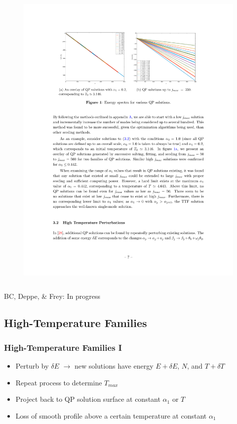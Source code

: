 \documentclass[mathserif,10pt]{beamer}
\newcommand{\bi}{\begin{itemize}}
\newcommand{\ei}{\end{itemize}}
\newcommand{\its}{\item}
\newcommand{\scr}{\scriptsize}
\begin{document}
{{\begin{columns}
\begin{figure}
  \includegraphics[scale=0.75]{families}
  \end{figure}
  \end{columns}
  \begin{center}
  {\scr BC, Deppe, \& Frey: In progress}
  \end{center}
  
  \vfill
}


\subsection{High-Temperature Families}
\frame
{
  \frametitle{High-Temperature Families I}
  \bi
  \its Perturb by $\delta E$ $\to$ new solutions have energy $E + \delta E$, $N$, and $T + \delta T$
  \its Repeat process to determine $T_{max}$
  \its Project back to QP solution surface at constant $\alpha_1$ or $T$
  \its Loss of smooth profile above a certain temperature at \alert<1>{constant $\alpha_1$} 
  \ei
  
}}
\end{document}
